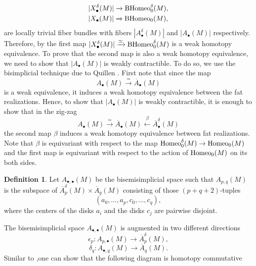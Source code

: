 \documentclass[a4paper]{amsart}
\theoremstyle{definition}
\newtheorem{defn}[thm]{Definition}
\theoremstyle{remark}
\newcommand{\tH}{\text{\textnormal{Homeo}}}
\newcommand{\BH}{\mathrm{B}\text{\textnormal{Homeo}}}
\newcommand{\tdH}{\text{Homeo}^{\delta}}
\newcommand{\BdH}{\mathrm{B}\text{\textnormal{Homeo}}^{\delta}}
\numberwithin{equation}{section}
\begin{document}
\begin{equation}\label{ee}
\begin{gathered}
|X_{\bullet}^{\delta}(M)|\xrightarrow{} \BdH_0(M),\\
|X_{\bullet}(M)|\xrightarrow{} \BH_0(M),
\end{gathered}
\end{equation}
are locally trivial fiber bundles with fibers $|A^{\delta}_{\bullet}(M)|$ and $|A_{\bullet}(M)|$ respectively. Therefore, by  the first map $|X_{\bullet}^{\delta}(M)|\xrightarrow{\simeq} \BdH_0(M)$ is a weak homotopy equivalence. To prove that the second map is also a weak homotopy equivalence, we need to show that $|A_{\bullet}(M)|$ is weakly contractible. To do so, we use the bisimplicial technique due to Quillen \cite[Proof of Theorem A]{MR0338129}. First note that since the map
\[
A_{\bullet}(M)\xrightarrow{\simeq} \overline{A}_{\bullet}(M)
\]
is a weak equivalence, it induces a weak homotopy equivalence between the fat realizations. Hence, to show that $| A_{\bullet}(M)|$ is weakly contractible, it is enough to show that in the zig-zag
\begin{equation}\label{eq:3}
A_{\bullet}(M)\xrightarrow{\simeq} \overline{A}_{\bullet}(M)\xleftarrow{\beta} \overline{A}^{\delta}_{\bullet}(M)
\end{equation}
the second map $\beta$ induces a weak homotopy equivalence between fat realizations.  Note that $\beta$ is equivariant with respect to the map $\tdH_0(M)\to \tH_0(M)$ and the first map is equivariant with respect to the action of $\tH_0(M)$ on its both sides.
\begin{defn}
Let $A_{\bullet,\bullet}(M)$ be the bisemisimplicial space such that $A_{p,q}(M)$ is the subspace of  $\overline{A}^{\delta}_{p}(M)\times  \overline{A}_{q}(M)$ consisting of those $(p+q+2)$-tuples $$(a_0,\dots,a_p,c_0,\dots,c_q),$$ where the centers of the disks $a_i$ and the disks $c_j$ are pairwise disjoint.
\end{defn}
The bisemisimplicial space $A_{\bullet,\bullet}(M)$ is augmented in two different directions
\[
\epsilon_p:A_{p,\bullet}(M)\to \overline{A}^{\delta}_{p}(M),
\]
\[
\delta_q: A_{\bullet,q}(M)\to \overline{A}_{q}(M).
\]
Similar to \cite[Lemma 5.8]{galatius2014homological} ,one can show  that the following diagram is homotopy commutative
\end{document}
